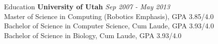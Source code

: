\documentclass{resume} %
\begin{document}

\begin{rSection}{Education}
{\bf University of Utah} \hfill {\em Sep 2007 - May 2013} \\
Master of Science in Computing (Robotics Emphasis), GPA 3.85/4.0 \\
Bachelor of Science in Computer Science, Cum Laude, GPA 3.93/4.0 \\
Bachelor of Science in Biology, Cum Laude, GPA 3.93/4.0 \\
\end{rSection}

\end{document}

